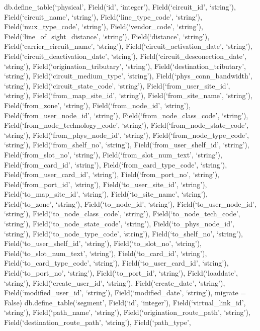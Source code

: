 \documentclass[
  12pt,
  spanish,
]{article}
\begin{document}
db.define\_table(`physical', Field(`id', `integer'),
Field(`circuit\_id', `string'), Field(`circuit\_name', `string'),
Field(`line\_type\_code', `string'), Field(`mux\_type\_code', `string'),
Field(`vendor\_code', `string'), Field(`line\_of\_sight\_distance',
`string'), Field(`distance', `string'), Field(`carrier\_circuit\_name',
`string'), Field(`circuit\_activation\_date', `string'),
Field(`circuit\_deactivation\_date', `string'),
Field(`circuit\_desconection\_date', `string'),
Field(`origination\_tributary', `string'),
Field(`destination\_tributary', `string'),
Field(`circuit\_medium\_type', `string'), Field(`phys\_conn\_bandwidth',
`string'), Field(`circuit\_state\_code', `string'),
Field(`from\_user\_site\_id', `string'), Field(`from\_map\_site\_id',
`string'), Field(`from\_site\_name', `string'), Field(`from\_zone',
`string'), Field(`from\_node\_id', `string'),
Field(`from\_user\_node\_id', `string'),
Field(`from\_node\_class\_code', `string'),
Field(`from\_node\_technology\_code', `string'),
Field(`from\_node\_state\_code', `string'),
Field(`from\_phys\_node\_id', `string'), Field(`from\_node\_type\_code',
`string'), Field(`from\_shelf\_no', `string'),
Field(`from\_user\_shelf\_id', `string'), Field(`from\_slot\_no',
`string'), Field(`from\_slot\_num\_text', `string'),
Field(`from\_card\_id', `string'), Field(`from\_card\_type\_code',
`string'), Field(`from\_user\_card\_id', `string'),
Field(`from\_port\_no', `string'), Field(`from\_port\_id', `string'),
Field(`to\_user\_site\_id', `string'), Field(`to\_map\_site\_id',
`string'), Field(`to\_site\_name', `string'), Field(`to\_zone',
`string'), Field(`to\_node\_id', `string'), Field(`to\_user\_node\_id',
`string'), Field(`to\_node\_class\_code', `string'),
Field(`to\_node\_tech\_code', `string'), Field(`to\_node\_state\_code',
`string'), Field(`to\_phys\_node\_id', `string'),
Field(`to\_node\_type\_code', `string'), Field(`to\_shelf\_no',
`string'), Field(`to\_user\_shelf\_id', `string'), Field(`to\_slot\_no',
`string'), Field(`to\_slot\_num\_text', `string'), Field(`to\_card\_id',
`string'), Field(`to\_card\_type\_code', `string'),
Field(`to\_user\_card\_id', `string'), Field(`to\_port\_no', `string'),
Field(`to\_port\_id', `string'), Field(`loaddate', `string'),
Field(`create\_user\_id', `string'), Field(`create\_date', `string'),
Field(`modified\_user\_id', `string'), Field(`modified\_date',
`string'), migrate = False) db.define\_table(`segment', Field(`id',
`integer'), Field(`virtual\_link\_id', `string'), Field(`path\_name',
`string'), Field(`origination\_route\_path', `string'),
Field(`destination\_route\_path', `string'), Field(`path\_type',
\end{document}
